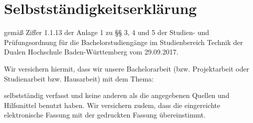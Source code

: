 \thispagestyle{empty}
\section*{\Huge{Selbstständigkeitserklärung}}

gemäß Ziffer 1.1.13 der Anlage 1 zu §§ 3, 4 und 5  der Studien- und Prüfungsordnung für die Bachelorstudiengänge im Studienbereich Technik der Dualen Hochschule Baden-Würt­tem­berg vom 29.09.2017.

\noindent Wir versichern hiermit, dass wir unsere Bachelorarbeit (bzw. Projektarbeit oder Studienarbeit bzw. Hausarbeit) mit dem Thema: 
\begin{center}
	\Large\textbf{\vTitel}
\end{center}
selbstständig verfasst und keine anderen als die angegebenen Quellen und Hilfsmittel benutzt haben. Wir versichern zudem, dass die eingereichte elektronische Fassung mit der gedruckten Fassung übereinstimmt.

